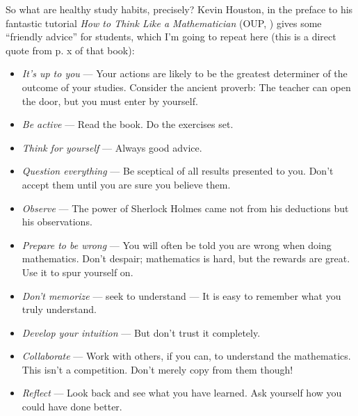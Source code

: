So what are healthy study habits, precisely?
Kevin Houston, in the preface to his fantastic tutorial \emph{How to Think Like a Mathematician} (OUP, ) gives some ``friendly advice'' for students,
which I'm going to repeat here (this is a direct quote from p. x of that book):
		\begin{itemize}
		
			\item \emph{It’s up to you} --- Your actions are likely to be the greatest determiner of the outcome of your studies. Consider the ancient proverb: The teacher can open the door, but you must enter by yourself.
			
			\item  \emph{Be active} --- Read the book. Do the exercises set.

			\item  \emph{Think for yourself} --- Always good advice.

			\item  \emph{Question everything} --- Be sceptical of all results presented to you. Don’t accept them until you are sure you believe them.

			\item  \emph{Observe} --- The power of Sherlock Holmes came not from his deductions but his observations.

			\item  \emph{Prepare to be wrong} --- You will often be told you are wrong when doing mathematics. Don’t despair; mathematics is hard, but the rewards are great. Use it to spur yourself on.

			\item  \emph{Don't memorize} --- seek to understand --- It is easy to remember what you truly understand.
			
			\item  \emph{Develop your intuition} --- But don’t trust it completely.

			\item  \emph{Collaborate} --- Work with others, if you can, to understand the mathematics. This isn't a competition. Don’t merely copy from them though!
			
			\item  \emph{Reflect} --- Look back and see what you have learned. Ask yourself how you could have
done better.

		\end{itemize}


